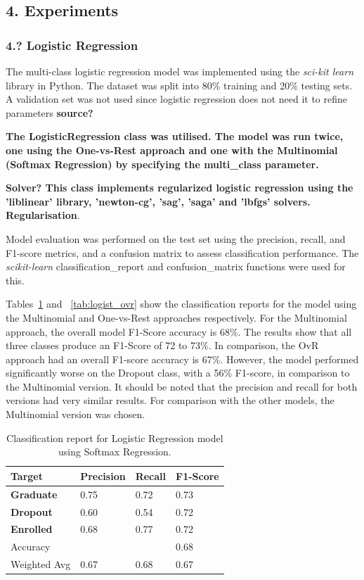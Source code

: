 \documentclass[12pt]{article}
\begin{document}
\newpage
\subsection*{4. Experiments}
\subsubsection*{4.? Logistic Regression}

The multi-class logistic regression model was implemented using the \textit{sci-kit learn} library in Python. The dataset was split into 80\% training and 20\% testing sets. A validation set was not used since logistic regression does not need it to refine parameters \textbf{source?}

\textbf{The LogisticRegression class was utilised. The model was run twice, one using the One-vs-Rest approach and one with the Multinomial (Softmax Regression) by specifying the multi\_class parameter.} 

\textbf{Solver? This class implements regularized logistic regression using the 'liblinear' library, 'newton-cg', 'sag', 'saga' and 'lbfgs' solvers. Regularisation}. 

Model evaluation was performed on the test set using the precision, recall, and F1-score metrics, and a confusion matrix to assess classification performance. The \textit{scikit-learn} classification\_report and confusion\_matrix functions were used for this. 

Tables~\ref{tab:logist_multinomial} and ~\ref{tab:logist_ovr} show the classification reports for the model using the Multinomial and One-vs-Rest approaches respectively. For the Multinomial approach, the overall model F1-Score accuracy is 68\%. The results show that all three classes produce an F1-Score of 72 to 73\%. In comparison, the OvR approach had an overall F1-score accuracy is 67\%. However, the model performed significantly worse on the Dropout class, with a 56\% F1-score, in comparison to the Multinomial version. It should be noted that the precision and recall for both versions had very similar results. For comparison with the other models, the Multinomial version was chosen.
 
\begin{table}[h!]
  \renewcommand{\arraystretch}{1.2} %
  \centering
  \begin{tabular}{ | m{2.5cm} || m{2cm} | m{2cm} | m{2cm} | } 
    \hline
    \textbf{Target} & \textbf{Precision} & \textbf{Recall} & \textbf{F1-Score} \\ 
    \hline
    \hline
    \textbf{Graduate} & 0.75 & 0.72 & 0.73 \\ 
    \hline
    \textbf{Dropout} & 0.60 & 0.54 & 0.72 \\ 
    \hline
    \textbf{Enrolled} & 0.68 & 0.77 & 0.72 \\
    \hline
    \hline
    Accuracy & \- & \- & 0.68 \\
    \hline
    Weighted Avg & 0.67 & 0.68 & 0.67 \\
    \hline
  \end{tabular}
  \caption{Classification report for Logistic Regression model using Softmax Regression.}
  \label{tab:logist_multinomial}
\end{table}
\end{document}
